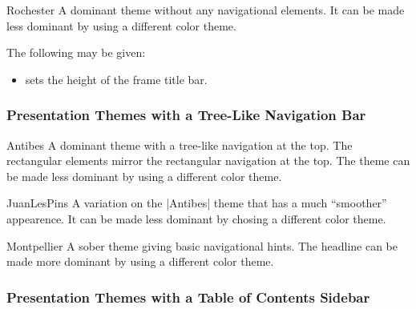 \begin{themeexample}{Rochester}
  A dominant theme without any navigational elements. It can be made less
  dominant by using a different color theme.

  The following  may be given:
  \begin{itemize}
  \item {} sets the height of the
    frame title bar.
  \end{itemize}
\end{themeexample}




\subsubsection{Presentation Themes with a Tree-Like Navigation Bar}

\begin{themeexample}{Antibes}
  A dominant theme with a tree-like navigation at the top. The 
  rectangular elements mirror the rectangular navigation at the
  top. The theme can be made less dominant by using a different color
  theme. 
\end{themeexample}

\begin{themeexample}{JuanLesPins}
  A variation on the |Antibes| theme that has a much ``smoother''
  appearence. It can be made less dominant by chosing a different
  color theme.
\end{themeexample}


\begin{themeexample}{Montpellier}
  A sober theme giving basic navigational hints. The headline can be
  made more dominant by using a different color theme.
\end{themeexample}



\subsubsection{Presentation Themes with a Table of Contents Sidebar}

